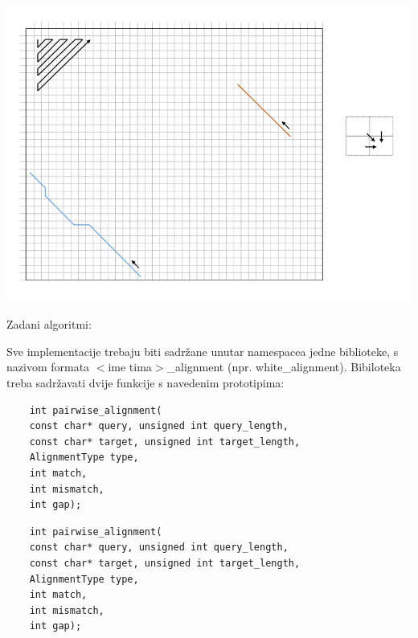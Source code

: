 \documentclass[times, 12pt, utf8]{article}
\begin{document}
	\includegraphics[width=\textwidth]{sample_alignment.png} 
	
	Zadani algoritmi:
	
	Sve implementacije trebaju biti sadržane unutar namespacea jedne biblioteke, 
	s nazivom formata \colorbox{gray!30}{$<$ime tima$>$\_alignment} 
	(npr. \colorbox{gray!30}{white\_alignment}). Bibiloteka
	treba sadržavati dvije funkcije s navedenim prototipima:
	
	\begin{lstlisting}
	int pairwise_alignment(
	const char* query, unsigned int query_length,
	const char* target, unsigned int target_length, 
	AlignmentType type,
	int match,
	int mismatch,
	int gap);
	\end{lstlisting}
	
	\begin{lstlisting}
	int pairwise_alignment(
	const char* query, unsigned int query_length,
	const char* target, unsigned int target_length, 
	AlignmentType type,
	int match,
	int mismatch,
	int gap);
	\end{lstlisting}
	
\end{document}
